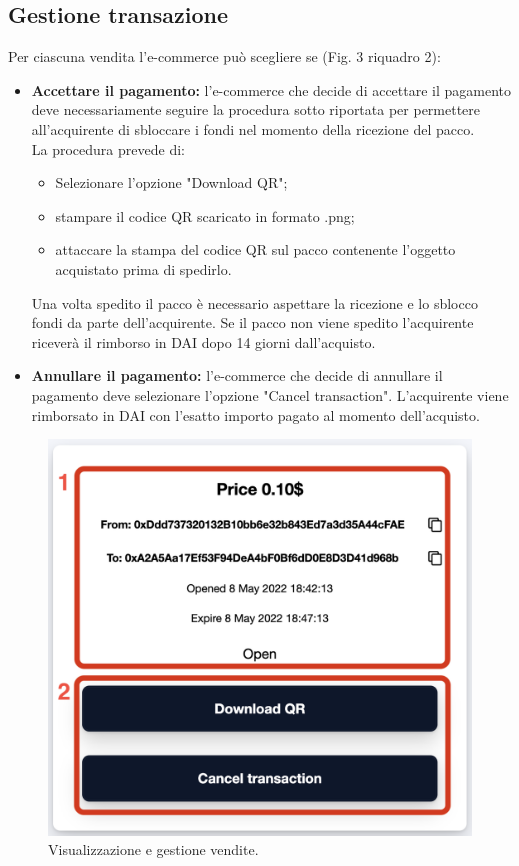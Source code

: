 \documentclass[a4paper, 12pt]{article}
\begin{document}
\subsection{Gestione transazione}
Per ciascuna vendita l'e-commerce può scegliere se (Fig. 3 riquadro 2):
\begin{itemize}
  \item \textbf{Accettare il pagamento:} l'e-commerce che decide di accettare il pagamento deve necessariamente seguire la procedura sotto riportata per permettere all'acquirente di sbloccare i fondi nel momento della ricezione del pacco.\\
  La procedura prevede di:
  \begin{itemize}
    \item Selezionare l'opzione "Download QR";
    \item stampare il codice QR scaricato in formato .png;
    \item attaccare la stampa del codice QR sul pacco contenente l'oggetto acquistato prima di spedirlo.
  \end{itemize}
  Una volta spedito il pacco è necessario aspettare la ricezione e lo sblocco fondi da parte dell'acquirente. Se il pacco non viene spedito l'acquirente riceverà il rimborso in DAI dopo 14 giorni dall'acquisto.\\
  \item \textbf{Annullare il pagamento:} l'e-commerce che decide di annullare il pagamento deve selezionare l'opzione "Cancel transaction". L'acquirente viene rimborsato in DAI con l'esatto importo pagato al momento dell'acquisto.
\end{itemize}
\FloatBarrier
\begin{figure}[!h]
\centering
\includegraphics[width=0.7\linewidth]{img/transazione_venditore.png}
\caption{Visualizzazione e gestione vendite.}
\end{figure}
\FloatBarrier
\end{document}
